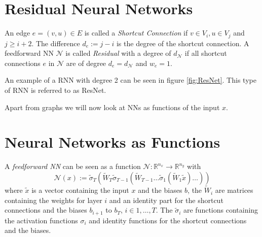 \documentclass[a4paper, 12pt]{scrreprt} %
\begin{document}
\section{Residual Neural Networks}
\label{sec:RNN}

\begin{definition}
An edge $e = (v,u) \in E$ is called a \emph{Shortcut Connection} if $v \in V_i, u \in V_j$ and $j \geq i+2$. The difference $d_e := j-i$ is the degree of the shortcut connection. 
A feedforward \ac{NN} $\mathcal{N}$ is called \emph{Residual} with a degree of $d_\mathcal{N}$ if all shortcut connections $e$ in $\mathcal{N}$ are of degree $d_e = d_\mathcal{N}$ and $w_e = 1$.

\end{definition}

An example of a \ac{RNN} with degree 2 can be seen in figure \ref{fig:ResNet}. This type of \ac{RNN} is referred to as ResNet.



Apart from graphs we will now look at \acp{NN} as functions of the input $x$.

\section{Neural Networks as Functions}
\label{sec:NNaF}

\begin{definition}
A \emph{feedforward \ac{NN}} can be seen as a function $\mathcal{N}:\mathbb{R}^{n_x} \to \mathbb{R}^{n_y}$ with
\begin{equation}
\mathcal{N}(x) := \tilde{\sigma}_T(\tilde{W}_T \tilde{\sigma}_{T-1}(\tilde{W}_{T-1} \dots \tilde{\sigma}_1(\tilde{W}_1 \tilde{x}) \dots ))
\label{eq:1}
\end{equation}
where $\tilde{x}$ is a vector containing the input $x$ and the biases $b$, the $\tilde{W}_i$ are matrices containing the weights for layer $i$ and an identity part for the shortcut connections and the biases $b_{i+1}$ to $b_{T}$, $i \in {1, \dots, T}$. The $\tilde{\sigma}_i$ are functions containing the activation functions $\sigma_i$ and identity functions for the shortcut connections and the biases. 
\end{definition}
\end{document}
